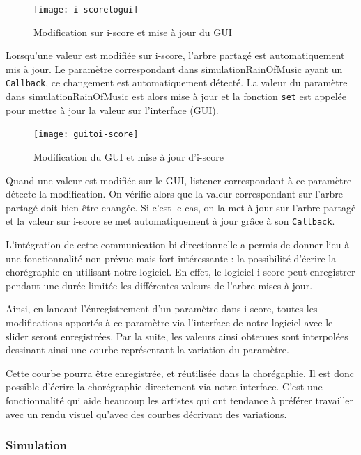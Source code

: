 \begin{figure}[H]
\begin{center}
\texttt{[image: i-scoretogui]}
\caption{Modification sur i-score et mise à jour du GUI}
\label{diag1}
\end{center}
\end{figure}

Lorsqu'une valeur est modifiée sur i-score, l'arbre partagé est automatiquement mis à jour. Le paramètre correspondant dans simulationRainOfMusic ayant un \verb|Callback|, ce changement est automatiquement détecté. La valeur du paramètre dans simulationRainOfMusic est alors mise à jour et la fonction \verb|set| est appelée pour mettre à jour la valeur sur l'interface (GUI).

\begin{figure}[H]
\begin{center}
\texttt{[image: guitoi-score]}
\caption{Modification du GUI et mise à jour d'i-score}
\label{diag2}
\end{center}
\end{figure}

Quand une valeur est modifiée sur le GUI, listener correspondant à ce paramètre détecte la modification. On vérifie alors que la valeur correspondant sur l'arbre partagé doit bien être changée. Si c'est le cas, on la met à jour sur l'arbre partagé et la valeur sur i-score se met automatiquement à jour grâce à son \verb|Callback|. 

L'intégration de cette communication bi-directionnelle a permis de donner lieu à une fonctionnalité non prévue mais fort intéressante : la possibilité d'écrire la chorégraphie en utilisant notre logiciel. En effet, le logiciel i-score peut enregistrer pendant une durée limitée les différentes valeurs de l'arbre mises à jour. 

Ainsi, en lancant l'énregistrement d'un paramètre dans i-score, toutes les modifications apportés à ce paramètre via l'interface de notre logiciel avec le slider seront enregistrées. Par la suite, les valeurs ainsi obtenues sont interpolées dessinant ainsi une courbe représentant la variation du paramètre.

Cette courbe pourra être enregistrée, et réutilisée dans la chorégaphie. Il est donc possible d'écrire la chorégraphie directement via notre interface. C'est une fonctionnalité qui aide beaucoup les artistes qui ont tendance à préférer travailler avec un rendu visuel qu'avec des courbes décrivant des variations.


\subsubsection{Simulation}

